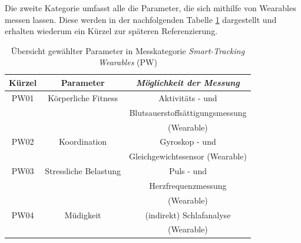 Die zweite Kategorie umfasst alle die Parameter, die sich mithilfe von Wearables messen lassen. Diese werden in der nachfolgenden Tabelle \ref{tab:pw} dargestellt und erhalten wiederum ein Kürzel zur späteren Referenzierung.

\begin{table}[htbp]
	\caption{Übersicht gewählter Parameter in Messkategorie \textit{Smart-Tracking Wearables} (PW)}
	\begin{center}
		\begin{tabular}{c c c }
			\hline
			Kürzel& \textbf{Parameter} & \textbf{\textit{Möglichkeit der Messung}}\\
			\hline
			PW01 & Körperliche Fitness & Aktivitäts - und  \\
			&& Blutsauerstoffsättigungsmessung \\
			&& (Wearable) \\
			PW02 & Koordination & Gyroskop - und \\
			&& Gleichgewichtssensor (Wearable) \\
			PW03 & Stressliche Belastung & Puls - und \\
			&& Herzfrequenzmessung \\
			&& (Wearable) \\
			PW04 & Müdigkeit & (indirekt) Schlafanalyse \\
			&& (Wearable) \\
			\hline
		\end{tabular}
		\label{tab:pw}
	\end{center}
\end{table}